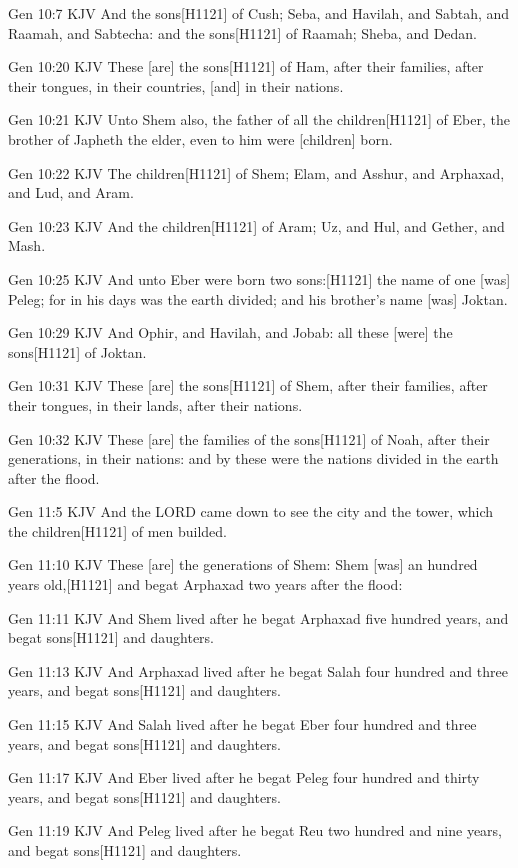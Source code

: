 \documentclass{book}
\begin{document}
Gen 10:7 KJV
And the sons[H1121] of Cush; Seba, and Havilah, and Sabtah, and Raamah, and Sabtecha: and the sons[H1121] of Raamah; Sheba, and Dedan.

Gen 10:20 KJV
These [are] the sons[H1121] of Ham, after their families, after their tongues, in their countries, [and] in their nations.

Gen 10:21 KJV
Unto Shem also, the father of all the children[H1121] of Eber, the brother of Japheth the elder, even to him were [children] born.

Gen 10:22 KJV
The children[H1121] of Shem; Elam, and Asshur, and Arphaxad, and Lud, and Aram.

Gen 10:23 KJV
And the children[H1121] of Aram; Uz, and Hul, and Gether, and Mash.

Gen 10:25 KJV
And unto Eber were born two sons:[H1121] the name of one [was] Peleg; for in his days was the earth divided; and his brother's name [was] Joktan.

Gen 10:29 KJV
And Ophir, and Havilah, and Jobab: all these [were] the sons[H1121] of Joktan.

Gen 10:31 KJV
These [are] the sons[H1121] of Shem, after their families, after their tongues, in their lands, after their nations.

Gen 10:32 KJV
These [are] the families of the sons[H1121] of Noah, after their generations, in their nations: and by these were the nations divided in the earth after the flood.

Gen 11:5 KJV
And the LORD came down to see the city and the tower, which the children[H1121] of men builded.

Gen 11:10 KJV
These [are] the generations of Shem: Shem [was] an hundred years old,[H1121] and begat Arphaxad two years after the flood:

Gen 11:11 KJV
And Shem lived after he begat Arphaxad five hundred years, and begat sons[H1121] and daughters.

Gen 11:13 KJV
And Arphaxad lived after he begat Salah four hundred and three years, and begat sons[H1121] and daughters.

Gen 11:15 KJV
And Salah lived after he begat Eber four hundred and three years, and begat sons[H1121] and daughters.

Gen 11:17 KJV
And Eber lived after he begat Peleg four hundred and thirty years, and begat sons[H1121] and daughters.

Gen 11:19 KJV
And Peleg lived after he begat Reu two hundred and nine years, and begat sons[H1121] and daughters.
\end{document}
